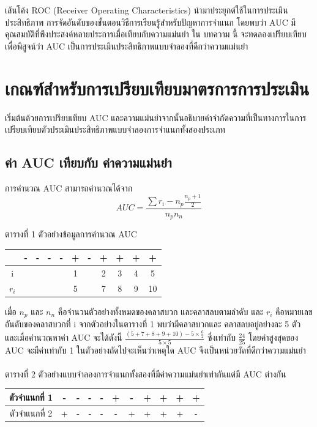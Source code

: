 \documentclass[twoside, twocolumn, 12pt]{article}
\begin{document}
เส้นโค้ง ROC (Receiver Operating Characteristics) นำมาประยุกต์ใช้ในการประเมินประสิทธิภาพ \cite{2, 3} การจัดอันดับของขั้นตอนวิธีการเรียนรู้สำหรับปัญหาการจำแนก \cite{4, 5} โดยพบว่า AUC มีคุณสมบัติที่พึงประสงค์หลายประการเมื่อเทียบกับความแม่นยำ \cite{6}
ใน บทความ นี้ จะทดลองเปรียบเทียบเพื่อพิสูจน์ว่า AUC เป็นการประเมินประสิทธิภาพแบบจำลองที่ดีกว่าความแม่นยำ

\section{เกณฑ์สำหรับการเปรียบเทียบมาตรการการประเมิน}
\quad เริ่มต้นด้วยการเปรียบเทียบ AUC และความแม่นยำจากนั้นอธิบายคำจำกัดความที่เป็นทางการในการเปรียบเทียบตัวประเมินประสิทธิภาพแบบจำลองการจำแนกทั้งสองประเภท
\subsection{ค่า AUC เทียบกับ ค่าความแม่นยำ}
\quad การคำนวณ AUC สามารถคำนวณได้จาก \cite{7}
\begin{equation}
AUC = \frac{\sum r_i-n_p\frac{n_p + 1}{2}}{n_pn_n}
\end{equation}
\begin{center} ตารางที่ 1 ตัวอย่างข้อมูลการคำนวณ AUC \end{center}
\begin{center}
\begin{tabular}{ccccccccccc}
  &-&-&-&-&+&-&+&+&+&+ \\
  \hline
  i&&&&&1&&2&3&4&5 \\
  $r_i$& & & & & 5&&7&8&9&10\\
  \hline  
\end{tabular}
\end{center}

เมื่อ $n_p$ และ $n_n$ คือจำนวนตัวอย่างทั้งหมดของคลาสบวก และคลาสลบตามลำดับ และ $r_i$ คือหมายเลขอันดับของคลาสบวกที่ i จากตัวอย่างในตารางที่ 1 พบว่ามีคลาสบวกและ คลาสลบอยู่อย่างละ 5 ตัว และเมื่อคำนวณหาค่า AUC จะได้ดังนี้ $\frac{(5+7+8+9+10)- 5\times\frac{6}{2}}{5\times5}$ ซึ่งเท่ากับ $\frac{24}{25}$ โดยค่าสูงสุดของ AUC จะมีค่าเท่ากับ 1 ในตัวอย่างถัดไปจะเห็นว่าเหตุใด AUC จึงเป็นหน่วยวัดที่ดีกว่าความแม่นยำ\\\\
ตารางที่ 2 ตัวอย่างแบบจำลองการจำแนกทั้งสองที่มีค่าความแม่นยำเท่ากันแต่มี AUC ต่างกัน
\begin{center}
\begin{tabular}{|c|ccccc|ccccc|}
  \hline
  ตัวจำแนกที่ 1 &-& -& -& -& +& -& +& +& +& +\\
  \hline
  ตัวจำแนกที่ 2 & +& -& -& -& -& +& +& +& +& -\\
  \hline  
\end{tabular}
\end{center}
\end{document}
